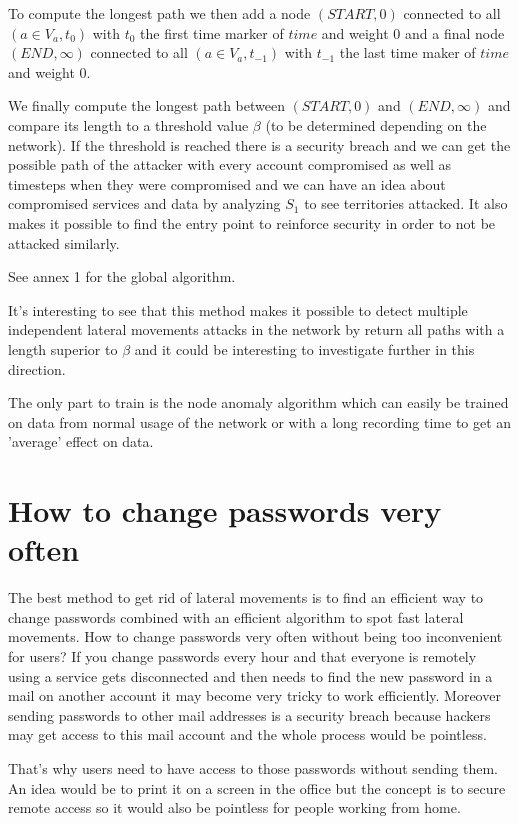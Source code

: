 \documentclass[11pt]{article}
\begin{document}
To compute the longest path we then add a node $(START,0)$ connected to all $(a\in V_a,t_0)$ with $t_0$ the first time marker of $time$ and weight 0 and a final node $(END,\infty)$ connected to all $(a\in V_a,t_{-1})$ with $t_{-1}$ the last time maker of $time$ and weight 0.

We finally compute the longest path between $(START,0)$ and $(END,\infty)$ and compare its length to a threshold value $\beta$ (to be determined depending on the network). If the threshold is reached there is a security breach and we can get the possible path of the attacker with every account compromised as well as timesteps when they were compromised and we can have an idea about compromised services and data by analyzing $S_1$ to see territories attacked. It also makes it possible to find the entry point to reinforce security in order to not be attacked similarly.

See annex 1 for the global algorithm.

It's interesting to see that this method makes it possible to detect multiple independent lateral movements attacks in the network by return all paths with a length superior to $\beta$ and it could be interesting to investigate further in this direction.

The only part to train is the node anomaly algorithm which can easily be trained on data from normal usage of the network or with a long recording time to get an 'average' effect on data.

\section{How to change passwords very often}
The best method to get rid of lateral movements is to find an efficient way to change passwords combined with an efficient algorithm to spot fast lateral movements. How to change passwords very often without being too inconvenient for users? If you change passwords every hour and that everyone is remotely using a service gets disconnected and then needs to find the new password in a mail on another account it may become very tricky to work efficiently. Moreover sending passwords to other mail addresses is a security breach because hackers may get access to this mail account and the whole process would be pointless.

That's why users need to have access to those passwords without sending them. An idea would be to print it on a screen in the office but the concept is to secure remote access so it would also be pointless for people working from home.
\end{document}
